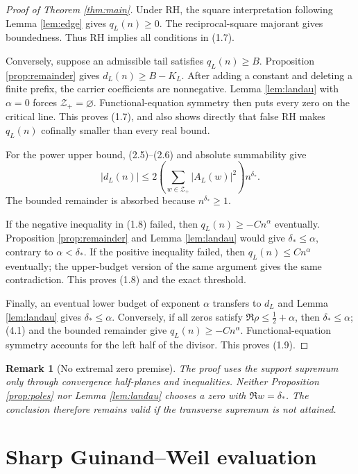 \documentclass[11pt]{article}
\newtheorem{remark}[theorem]{Remark}
\newcommand{\cZ}{\mathcal Z}
\begin{document}
\begin{proof}[Proof of Theorem \ref{thm:main}]
Under RH, the square interpretation following Lemma \ref{lem:edge} gives \(q_L(n)\ge0\).
The reciprocal-square majorant gives boundedness.  Thus RH implies all conditions in (1.7).

Conversely, suppose an admissible tail satisfies \(q_L(n)\ge B\).  Proposition
\ref{prop:remainder} gives \(d_L(n)\ge B-K_L\).  After adding a constant and deleting a finite
prefix, the carrier coefficients are nonnegative.  Lemma \ref{lem:landau} with \(\alpha=0\)
forces \(\cZ_+=\varnothing\).  Functional-equation symmetry then puts every zero on the critical
line.  This proves (1.7), and also shows directly that false RH makes \(q_L(n)\) cofinally
smaller than every real bound.

For the power upper bound, (2.5)--(2.6) and absolute summability give
\[
 |d_L(n)|\le
 2\left(\sum_{w\in\cZ_+}|A_L(w)|^2\right)n^{\delta_*}.
\tag{4.1}
\]
The bounded remainder is absorbed because \(n^{\delta_*}\ge1\).

If the negative inequality in (1.8) failed, then \(q_L(n)\ge-Cn^\alpha\) eventually.
Proposition \ref{prop:remainder} and Lemma \ref{lem:landau} would give
\(\delta_*\le\alpha\), contrary to \(\alpha<\delta_*\).  If the positive inequality failed,
then \(q_L(n)\le Cn^\alpha\) eventually; the upper-budget version of the same argument gives the
same contradiction.  This proves (1.8) and the exact threshold.

Finally, an eventual lower budget of exponent \(\alpha\) transfers to \(d_L\) and Lemma
\ref{lem:landau} gives \(\delta_*\le\alpha\).  Conversely, if all zeros satisfy
\(\Re\rho\le\frac12+\alpha\), then \(\delta_*\le\alpha\); (4.1) and the bounded remainder give
\(q_L(n)\ge-Cn^\alpha\).  Functional-equation symmetry accounts for the left half of the divisor.
This proves (1.9).
\end{proof}

\begin{remark}[No extremal zero premise]
The proof uses the support supremum only through convergence half-planes and inequalities.
Neither Proposition \ref{prop:poles} nor Lemma \ref{lem:landau} chooses a zero with
\(\Re w=\delta_*\).  The conclusion therefore remains valid if the transverse supremum is not
attained.
\end{remark}

\section{Sharp Guinand--Weil evaluation}\label{sec:explicit}
\end{document}

